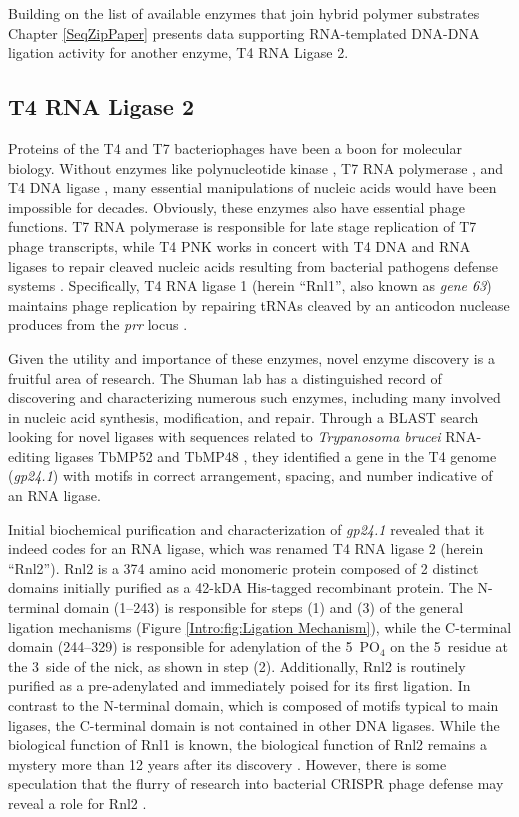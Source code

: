     Building on the list of available enzymes that join hybrid polymer substrates Chapter \ref{SeqZipPaper} presents data supporting RNA-templated DNA-DNA ligation activity for another enzyme, T4 RNA Ligase 2.

  \subsection{T4 RNA Ligase 2}
    \label{Intro:subsec:Rnl2}

    Proteins of the T4 and T7 bacteriophages have been a boon for molecular biology. Without enzymes like polynucleotide kinase \citep{Richardson1965a}, T7 RNA polymerase \citep{Summers1970b}, and T4 DNA ligase \citep{Weiss1967a}, many essential manipulations of nucleic acids would have been impossible for decades. Obviously, these enzymes also have essential phage functions. T7 RNA polymerase is responsible for late stage replication of T7 phage transcripts, while T4 PNK works in concert with T4 DNA and RNA ligases to repair cleaved  nucleic acids resulting from bacterial pathogens defense systems \citep{Wang2002b}. Specifically, T4 RNA ligase 1 (herein ``Rnl1'', also known as \textit{gene 63}) maintains phage replication by repairing tRNAs cleaved by an anticodon nuclease produces from the \textit{prr} locus \citep{Amitsur1987d}.

    Given the utility and importance of these enzymes, novel enzyme discovery is a fruitful area of research. The Shuman lab has a distinguished record of discovering and characterizing numerous such enzymes, including many involved in nucleic acid synthesis, modification, and repair. Through a BLAST search looking for novel ligases with sequences related to \textit{Trypanosoma brucei} RNA-editing ligases TbMP52 and TbMP48 \citep{Ho2002b}, they identified a gene in the T4 genome (\textit{gp24.1}) with motifs in correct arrangement, spacing, and number indicative of an RNA ligase.

    Initial biochemical purification and characterization of \textit{gp24.1} \citep{Ho2002b} revealed that it indeed codes for an RNA ligase, which was renamed T4 RNA ligase 2 (herein ``Rnl2''). Rnl2 is a 374 amino acid monomeric protein composed of 2 distinct domains initially purified as a 42-kDA His-tagged recombinant protein. The N-terminal domain (1--243) is responsible for steps (1) and (3) of the general ligation mechanisms (Figure \ref{Intro:fig:Ligation Mechanism}), while the C-terminal domain (244--329) is responsible for adenylation of the 5\textprime~PO$_{4}$ on the 5\textprime~residue at the 3\textprime~side of the nick, as shown in step (2). Additionally, Rnl2 is routinely purified as a pre-adenylated and immediately poised for its first ligation. In contrast to the N-terminal domain, which is composed of motifs typical to main ligases, the C-terminal domain is not contained in other DNA ligases. While the biological function of Rnl1 is known, the biological function of Rnl2 remains a mystery more than 12 years after its discovery \citep{Chauleau2013b}. However, there is some speculation that the flurry of research into bacterial CRISPR phage defense may reveal a role for Rnl2 \citep{Barrangou2007c,Chauleau2013b}.

